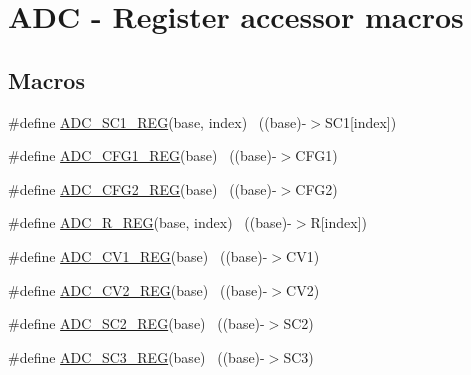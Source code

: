 \hypertarget{group___a_d_c___register___accessor___macros}{}\section{A\+DC -\/ Register accessor macros}
\label{group___a_d_c___register___accessor___macros}
\subsection*{Macros}
\begin{DoxyCompactItemize}
\item 
\#define \hyperlink{group___a_d_c___register___accessor___macros_ga222b4f9dbc62d3e7cdc7fab81d736b1f}{A\+D\+C\+\_\+\+S\+C1\+\_\+\+R\+EG}(base,  index)                                ~((base)-\/$>$S\+C1\mbox{[}index\mbox{]})
\item 
\#define \hyperlink{group___a_d_c___register___accessor___macros_ga1d379c53bd79f7568c89802f14ae147a}{A\+D\+C\+\_\+\+C\+F\+G1\+\_\+\+R\+EG}(base)                                          ~((base)-\/$>$C\+F\+G1)
\item 
\#define \hyperlink{group___a_d_c___register___accessor___macros_ga95c3a7cebd9170a6d22b0176e8167899}{A\+D\+C\+\_\+\+C\+F\+G2\+\_\+\+R\+EG}(base)                                          ~((base)-\/$>$C\+F\+G2)
\item 
\#define \hyperlink{group___a_d_c___register___accessor___macros_gaa73e4be773e5276ec891d3ae1cfd7944}{A\+D\+C\+\_\+\+R\+\_\+\+R\+EG}(base,  index)                                    ~((base)-\/$>$R\mbox{[}index\mbox{]})
\item 
\#define \hyperlink{group___a_d_c___register___accessor___macros_gaf1a44ade9e2d74c7a84112c805324a85}{A\+D\+C\+\_\+\+C\+V1\+\_\+\+R\+EG}(base)                                            ~((base)-\/$>$C\+V1)
\item 
\#define \hyperlink{group___a_d_c___register___accessor___macros_ga9f977af3e7e4f2a9840761e0b789edfa}{A\+D\+C\+\_\+\+C\+V2\+\_\+\+R\+EG}(base)                                            ~((base)-\/$>$C\+V2)
\item 
\#define \hyperlink{group___a_d_c___register___accessor___macros_ga59320fe45b43cd7adf0432961b7fd878}{A\+D\+C\+\_\+\+S\+C2\+\_\+\+R\+EG}(base)                                            ~((base)-\/$>$S\+C2)
\item 
\#define \hyperlink{group___a_d_c___register___accessor___macros_ga3ad2d8654c9403859753d71eb1ff0f6e}{A\+D\+C\+\_\+\+S\+C3\+\_\+\+R\+EG}(base)                                            ~((base)-\/$>$S\+C3)

\end{DoxyCompactItemize}
